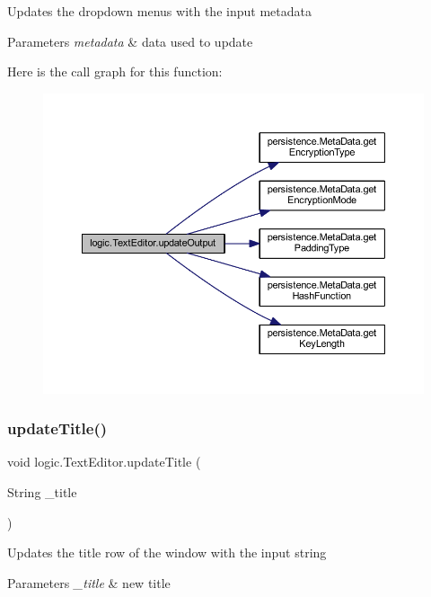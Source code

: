 Updates the dropdown menus with the input metadata 
\begin{DoxyParams}{Parameters}
{\em metadata} & data used to update \\
\hline
\end{DoxyParams}
Here is the call graph for this function\+:\nopagebreak
\begin{figure}[H]
\begin{center}
\leavevmode
\includegraphics[width=350pt]{classlogic_1_1_text_editor_ab03a3aa2457f10c003cc12c08e806e43_cgraph}
\end{center}
\end{figure}
\mbox{\label{classlogic_1_1_text_editor_a3e994bcaa8e3e6983c8867003347af20}} 
\subsubsection{\texorpdfstring{update\+Title()}{updateTitle()}}
{\footnotesize\ttfamily void logic.\+Text\+Editor.\+update\+Title (\begin{DoxyParamCaption}\item[{String}]{\+\_\+title }\end{DoxyParamCaption})\hspace{0.3cm}{\ttfamily [private]}}

Updates the title row of the window with the input string 
\begin{DoxyParams}{Parameters}
{\em \+\_\+title} & new title \\
\hline
\end{DoxyParams}


